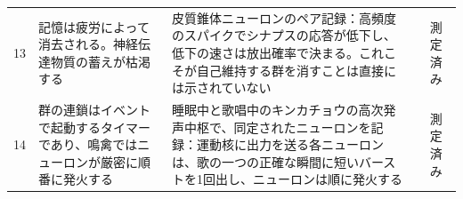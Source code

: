 {\begin{longtable}{>{\raggedright}p{0.5cm}>{\raggedright}p{4.0cm}>{\raggedright}p{5.6cm}>{\raggedright}p{2.3cm}>{\raggedright\arraybackslash}p{1.7cm}}
13 & 記憶は疲労によって消去される。神経伝達物質の蓄えが枯渇する & 皮質錐体ニューロンのペア記録：高頻度のスパイクでシナプスの応答が低下し、低下の速さは放出確率で決まる。これこそが自己維持する群を消すことは直接には示されていない & \cite{Tsodyks1997} & 測定済み \\
14 & 群の連鎖はイベントで起動するタイマーであり、鳴禽ではニューロンが厳密に順番に発火する & 睡眠中と歌唱中のキンカチョウの高次発声中枢で、同定されたニューロンを記録：運動核に出力を送る各ニューロンは、歌の一つの正確な瞬間に短いバーストを1回出し、ニューロンは順に発火する & \cite{Hahnloser2002} & 測定済み \\
\bottomrule
\end{longtable}}
